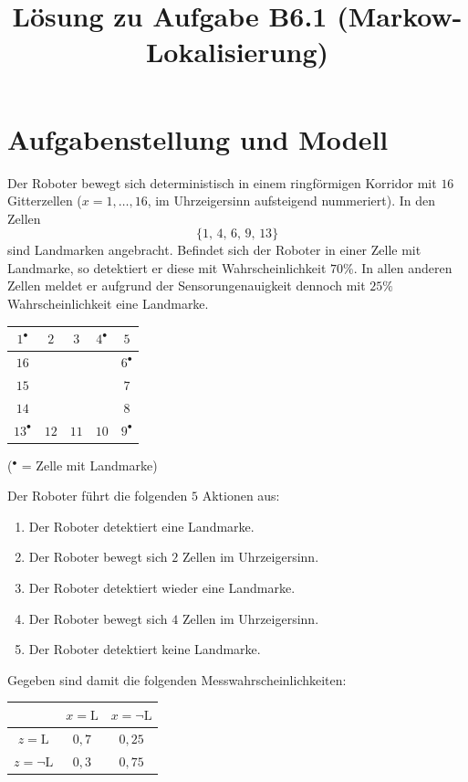 \documentclass[11pt,a4paper]{article}
\title{Lösung zu Aufgabe B6.1 (Markow-Lokalisierung)}
\author{}
\date{}
\newcommand{\LM}{\mathrm{L}}
\begin{document}
\maketitle

\section*{Aufgabenstellung und Modell}

Der Roboter bewegt sich deterministisch in einem ringförmigen Korridor mit $16$ Gitterzellen
($x=1,\dots,16$, im Uhrzeigersinn aufsteigend nummeriert). In den Zellen
\[
  \{1,\,4,\,6,\,9,\,13\}
\]
sind Landmarken angebracht. Befindet sich der Roboter in einer Zelle mit Landmarke, so detektiert
er diese mit Wahrscheinlichkeit $70\%$. In allen anderen Zellen meldet er aufgrund der
Sensorungenauigkeit dennoch mit $25\%$ Wahrscheinlichkeit eine Landmarke.

\begin{center}
\setlength{\tabcolsep}{8pt}
\begin{tabular}{|c|c|c|c|c|}
\hline
$1^{\bullet}$ & $2$ & $3$ & $4^{\bullet}$ & $5$ \\\hline
$16$ & & & & $6^{\bullet}$ \\\hline
$15$ & & & & $7$ \\\hline
$14$ & & & & $8$ \\\hline
$13^{\bullet}$ & $12$ & $11$ & $10$ & $9^{\bullet}$ \\\hline
\end{tabular}
\end{center}
{\small ($^{\bullet}$ = Zelle mit Landmarke)}

Der Roboter führt die folgenden $5$ Aktionen aus:
\begin{enumerate}
  \item Der Roboter detektiert eine Landmarke.
  \item Der Roboter bewegt sich $2$ Zellen im Uhrzeigersinn.
  \item Der Roboter detektiert wieder eine Landmarke.
  \item Der Roboter bewegt sich $4$ Zellen im Uhrzeigersinn.
  \item Der Roboter detektiert keine Landmarke.
\end{enumerate}

Gegeben sind damit die folgenden Mess\-wahr\-schein\-lich\-keiten:

\begin{center}
\setlength{\tabcolsep}{10pt}
\begin{tabular}{c|cc}
\toprule
 & $x=\LM$ & $x=\neg\LM$ \\
\midrule
$z=\LM$       & $0{,}7$ & $0{,}25$ \\
$z=\neg\LM$   & $0{,}3$ & $0{,}75$ \\
\bottomrule
\end{tabular}
\end{center}
\end{document}
